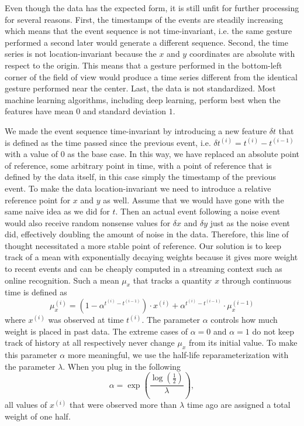 Even though the data has the expected form, it is still unfit for further
processing for several reasons. First, the timestamps of the events are steadily
increasing which means that the event sequence is not time-invariant, i.e. the
same gesture performed a second later would generate a different sequence.
Second, the time series is not location-invariant because the $x$ and $y$
coordinates are absolute with respect to the origin. This means that a gesture
performed in the bottom-left corner of the field of view would produce a time
series different from the identical gesture performed near the center. Last, the
data is not standardized. Most machine learning algorithms, including deep
learning, perform best when the features have mean $0$ and standard deviation
$1$.

We made the event sequence time-invariant by introducing a new feature $\delta
t$ that is defined as the time passed since the previous event, i.e. $\delta
t^{(i)} = t^{(i)} - t^{(i - 1)}$ with a value of $0$ as the base case. In this
way, we have replaced an absolute point of reference, some arbitrary point in
time, with a point of reference that is defined by the data itself, in this case
simply the timestamp of the previous event. To make the data location-invariant
we need to introduce a relative reference point for $x$ and $y$ as well. Assume
that we would have gone with the same naive idea as we did for $t$. Then an
actual event following a noise event would also receive random nonsense values
for $\delta x$ and $\delta y$ just as the noise event did, effectively doubling
the amount of noise in the data. Therefore, this line of thought necessitated a
more stable point of reference. Our solution is to keep track of a mean with
exponentially decaying weights because it gives more weight to recent events and
can be cheaply computed in a streaming context such as online recognition. Such
a mean $\mu_{x}$ that tracks a quantity $x$ through continuous time is defined
as
\begin{equation*}
  \mu_{x}^{(i)} = \left( 1 - \alpha^{t^{(i)} - t^{(i - 1)}} \right) \cdot x^{(i)} + \alpha^{t^{(i)} - t^{(i - 1)}} \cdot \mu_{x}^{(i - 1)}
\end{equation*}
where $x^{(i)}$ was observed at time $t^{(i)}$. The parameter $\alpha$ controls
how much weight is placed in past data. The extreme cases of $\alpha = 0$ and
$\alpha = 1$ do not keep track of history at all respectively never change
$\mu_{x}$ from its initial value. To make this parameter $\alpha$ more
meaningful, we use the half-life reparameterization with the parameter
$\lambda$. When you plug in the following
\begin{equation*}
  \alpha = \exp\left( \frac{\log\left( \frac{1}{2} \right)}{\lambda} \right),
\end{equation*}
all values of $x^{(i)}$ that were observed more than $\lambda$ time ago are
assigned a total weight of one half.

